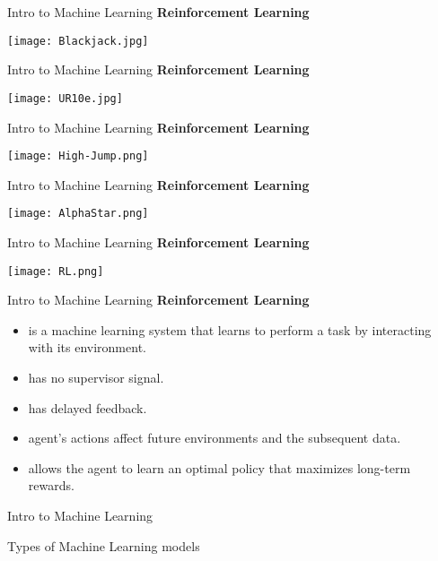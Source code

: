 \documentclass{beamer}
\begin{document}
\begin{frame}[fragile]{Intro to Machine Learning}
    \textbf{Reinforcement Learning}
    \begin{center}
        \texttt{[image: Blackjack.jpg]}
    \end{center}
\end{frame}
\begin{frame}[fragile]{Intro to Machine Learning}
    \textbf{Reinforcement Learning}
    \begin{center}
        \texttt{[image: UR10e.jpg]}
    \end{center}
\end{frame}
\begin{frame}[fragile]{Intro to Machine Learning}
    \textbf{Reinforcement Learning}
    \begin{center}
        \texttt{[image: High-Jump.png]}
    \end{center}
\end{frame}
\begin{frame}[fragile]{Intro to Machine Learning}
    \textbf{Reinforcement Learning}
    \begin{center}
        \texttt{[image: AlphaStar.png]}
    \end{center}
\end{frame}
\begin{frame}[fragile]{Intro to Machine Learning}
    \textbf{Reinforcement Learning}
    \begin{center}
        \texttt{[image: RL.png]}
    \end{center}
\end{frame}
\begin{frame}[fragile]{Intro to Machine Learning}
    \textbf{Reinforcement Learning}
    \begin{itemize}
        \item is a machine learning system that learns to perform a task by interacting with its environment.
        \item has no supervisor signal.
        \item has delayed feedback.
        \item agent's actions affect future environments and the subsequent data.
        \item allows the agent to learn an optimal policy that maximizes long-term rewards.
    \end{itemize}
\end{frame}
\begin{frame}[fragile]{Intro to Machine Learning}
    \begin{center}
        \Huge Types of Machine Learning models
    \end{center}            
\end{frame}
\end{document}
